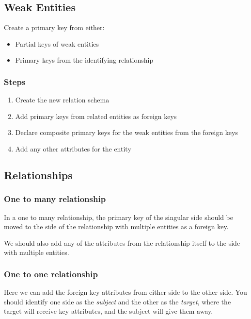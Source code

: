 \subsection{Weak Entities}\label{sub:weak_entities}

Create a primary key from either:
\begin{itemize}
    \item Partial keys of weak entities
    \item Primary keys from the identifying relationship
\end{itemize}

\subsubsection{Steps}\label{ssub:steps}

\begin{enumerate}
    \item Create the new relation schema
    \item Add primary keys from related entities as foreign keys
    \item Declare composite primary keys for the weak entities from the foreign keys
    \item Add any other attributes for the entity
\end{enumerate}

\subsection{Relationships}\label{sub:relationships_four}

\subsubsection{One to many relationship}\label{ssub:one_to_many_relationship}

In a one to many relationship, the primary key of the singular side should be moved to the side of the relationship with multiple entities as a foreign key.

We should also add any of the attributes from the relationship itself to the side with multiple entities.

\subsubsection{One to one relationship}\label{ssub:one_to_one_relationship}

Here we can add the foreign key attributes from either side to the other side.
You should identify one side as the \emph{subject} and the other as the \emph{target}, where the target will receive key attributes, and the subject will give them away.

